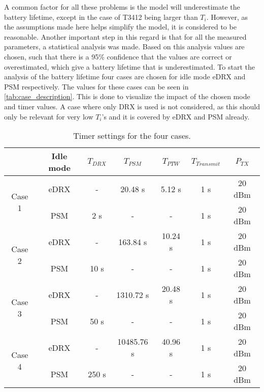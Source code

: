 A common factor for all these problems is the model will underestimate the battery lifetime, except in the case of T3412 being larger than $T_i$. However, as the assumptions made here helps simplify the model, it is considered to be reasonable. Another important step in this regard is that for all the measured parameters, a statistical analysis was made. Based on this analysis values are chosen, such that there is a 95\% confidence that the values are correct or overestimated, which give a battery lifetime that is underestimated. To start the analysis of the battery lifetime four cases are chosen for idle mode eDRX and PSM respectively. The values for these cases can be seen in \autoref{tab:case_description}. This is done to visualize the impact of the chosen mode and timer values. A case where only DRX is used is not considered, as this should only be relevant for very low $T_i$'s and it is covered by eDRX and PSM already.

\begin{table}[H]
\centering
\begin{tabular}{|c|c|c|c|c|c|c|} \hline
                & Idle mode & $T_{DRX}$    & $T_{PSM}$    & $T_{PTW}$    & $T_{Transmit}$    & $P_{TX}$     \\ \hline
\multirow{2}{*}{Case 1}    & eDRX & -         & 20.48 s    & 5.12 s    & 1 s                & 20 dBm    \\ \cline{2-7}
                        & PSM  & 2 s     & -            & -            & 1 s                & 20 dBm    \\ \hline
\multirow{2}{*}{Case 2}    & eDRX & -        & 163.84 s    & 10.24 s    & 1 s                & 20 dBm    \\ \cline{2-7}
                        & PSM  & 10 s    & -            & -            & 1 s                & 20 dBm    \\ \hline
\multirow{2}{*}{Case 3}    & eDRX & -        & 1310.72 s    & 20.48 s    & 1 s                & 20 dBm    \\ \cline{2-7}
                        & PSM  & 50 s    & -            & -            & 1 s                & 20 dBm    \\ \hline
\multirow{2}{*}{Case 4}    & eDRX & -        & 10485.76 s& 40.96 s    & 1 s                & 20 dBm    \\ \cline{2-7}
                        & PSM  & 250 s    & -            & -            & 1 s                & 20 dBm    \\ \hline
\end{tabular}
\caption{Timer settings for the four cases.}
\label{tab:case_description}
\end{table}

